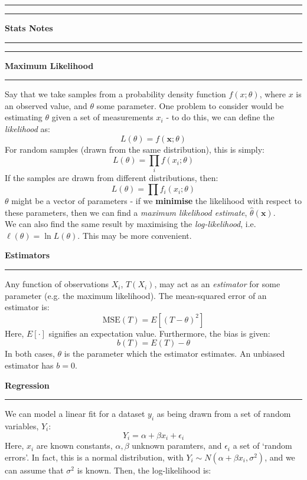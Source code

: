 \documentclass[12pt]{article}
\newcommand{\minisection}[1]{
    \par\vspace{0.25cm}
    \textbf{#1}\par
    \vspace{0.1cm}
    \hrule
    \vspace{0.25cm}
}
\newcommand{\doubleline}{
    \hrule
    \vspace*{0.05cm}
    \hrule
    \vspace*{0.25cm}
}
\begin{document}
    \doubleline
    \begin{center}
        \huge \textbf{Stats Notes}
    \end{center}
    \doubleline
    \minisection{Maximum Likelihood}
    Say that we take samples from a probability density function $f(x;\theta)$, where $x$ is an observed value, and $\theta$ some parameter. One problem to consider would be estimating $\theta$ given a set of measurements ${x_i}$ - to do this, we can define the \textit{likelihood} as:
    \begin{equation*}
        L(\theta) = f(\bm x;\theta)
    \end{equation*}
    For random samples (drawn from the same distribution), this is simply:
    \begin{equation*}
        L(\theta) = \prod_{i}f(x_i;\theta)
    \end{equation*}
    If the samples are drawn from different distributions, then:
    \begin{equation*}
        L(\theta) = \prod f_i(x_i;\theta)
    \end{equation*}
    $\theta$ might be a vector of parameters - if we \textbf{minimise} the likelihood with respect to these parameters, then we can find a \textit{maximum likelihood estimate}, $\hat\theta(\bm x)$.\\
    We can also find the same result by maximising the \textit{log-likelihood}, i.e. $\ell(\theta)=\ln L(\theta)$. This may be more convenient.
    \minisection{Estimators}
    Any function of observations $X_i$, $T(X_i)$, may act as an \textit{estimator} for some parameter (e.g. the maximum likelihood). The mean-squared error of an estimator is:
    \begin{equation*}
        \text{MSE}(T) = E[(T-\theta)^2]
    \end{equation*}
    Here, $E[\cdot]$ signifies an expectation value. Furthermore, the bias is given:
    \begin{equation*}
        b(T) = E(T) - \theta
    \end{equation*}
    In both cases, $\theta$ is the parameter which the estimator estimates. An unbiased estimator has $b=0$.
    \minisection{Regression}
    We can model a linear fit for a dataset $y_i$ as being drawn from a set of random variables, $Y_i$:
    \begin{equation*}
        Y_i = \alpha + \beta x_i + \epsilon_i
    \end{equation*}
    Here, $x_i$ are known constants, $\alpha,\beta$ unknown paramters, and $\epsilon_i$ a set of `random errors'. In fact, this is a normal distribution, with $Y_i\sim N(\alpha+\beta x_i,\sigma^2)$, and we can assume that $\sigma^2$ is known. Then, the log-likelihood is:
\end{document}
